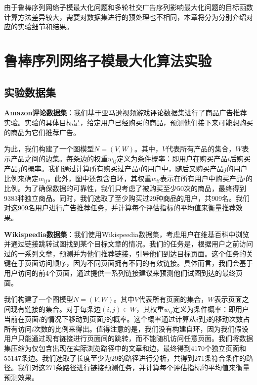 由于鲁棒序列网络子模最大化问题和多轮社交广告序列影响最大化问题的目标函数计算方法差异较大，需要对数据集进行的预处理也不相同，本章将分为分别介绍对应的实验细节和结果。

\section{鲁棒序列网络子模最大化算法实验}
\label{sec:5_1}

\subsection{实验数据集}

{\bfseries Amazon评论数据集}：我们基于亚马逊视频游戏评论数据集\cite{ni2019justifying}进行了商品广告推荐实验。实验的具体目标是，给定用户已经购买的商品，预测他们接下来可能想购买的商品为它们推荐广告。

为此，我们构建了一个图模型$N = (V,W)$。其中，$V$代表所有产品的集合，$W$表示产品之间的边集。每条边的权重$w_{ij}$定义为条件概率：即用户在购买产品$i$后购买产品$j$的概率。我们通过计算所有购买过产品$i$的用户中，随后又购买产品$j$的用户比例来确定$w_{ij}$。此外，图中还包含自环，其权重$w_{ii}$表示在所有用户中购买产品$i$的比例。为了确保数据的可靠性，我们只考虑了被购买至少50次的商品，最终得到9383种独立商品。同时，我们选取了至少购买过29种商品的用户，共909名。我们对这909名用户进行广告推荐任务，并计算每个评估指标的平均值来衡量推荐效果。

{\bfseries Wikispeedia数据集}：我们使用Wikispeedia数据集\cite{west2009wikispeedia}，考虑用户在维基百科中浏览并通过链接跳转试图找到某个目标文章的情况。我们的任务是，根据用户之前访问过的一系列文章，预测并为他们推荐链接，引导他们到达目标页面。这个任务的关键在于页面访问顺序，因为不同页面拥有不同的有效链接。具体而言，我们会基于用户访问的前4个页面，通过提供一系列链接建议来预测他们试图到达的最终页面。

我们构建了一个图模型$N = (V,W)$。其中$V$代表所有页面的集合，$W$表示页面之间现有链接的集合。对于每条边$(i,j)\in W$，其权重$w_{ij}$定义为条件概率：即用户当前在页面$i$的情况下移动到页面$j$的概率。这个概率通过计算从$i$到$j$的移动次数占所有访问$i$次数的比例来得出。值得注意的是，我们没有构建自环，因为我们假设用户只能通过现有链接进行页面间的跳转，而不能随机访问任意页面。我们将数据集压缩为仅包含出现在实际浏览路径中的文章和边，最终得到4170个独立页面和55147条边。我们选取了长度至少为29的路径进行分析，共得到271条符合条件的路径。我们对这271条路径进行链接预测任务，并计算每个评估指标的平均值来衡量预测效果。



